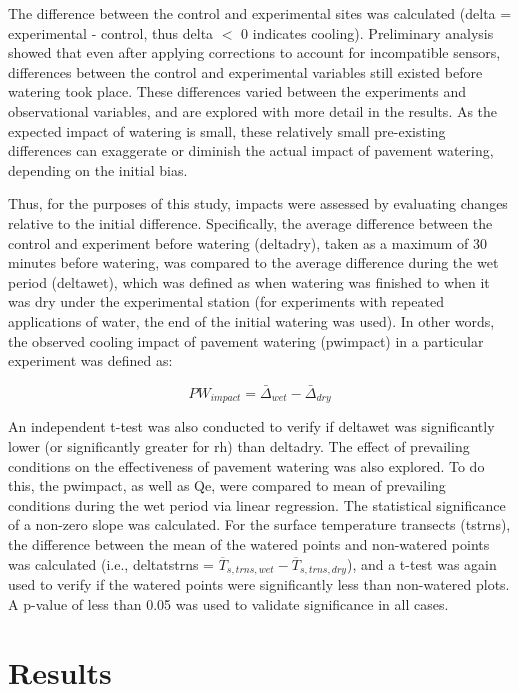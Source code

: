 \documentclass[final,3p,times,authoryear]{elsarticle}
\begin{document}
The difference between the control and experimental sites was calculated (\gls{delta} = experimental - control, thus \gls{delta} $<$ 0 indicates cooling). Preliminary analysis showed that even after applying corrections to account for incompatible sensors, differences between the control and experimental variables still existed before watering took place. These differences varied between the experiments and observational variables, and are explored with more detail in the results. As the expected impact of watering is small, these relatively small pre-existing differences can exaggerate or diminish the actual impact of pavement watering, depending on the initial bias.

Thus, for the purposes of this study, impacts were assessed by evaluating changes relative to the initial difference. Specifically, the average difference between the control and experiment before watering (\gls{deltadry}), taken as a maximum of 30 minutes before watering, was compared to the average difference during the wet period (\gls{deltawet}), which was defined as when watering was finished to when it was dry under the experimental station (for experiments with repeated applications of water, the end of the initial watering was used). In other words, the observed cooling impact of pavement watering (\gls{pwimpact}) in a particular experiment was defined as:

\begin{equation}
PW_{impact} = \bar{\Delta}_{wet} - \bar{\Delta}_{dry}
\label{eq:2.2} 
\end{equation}

An independent t-test was also conducted to verify if \gls{deltawet} was significantly lower (or significantly greater for \gls{rh}) than \gls{deltadry}. The effect of prevailing conditions on the effectiveness of pavement watering was also explored. To do this, the \gls{pwimpact}, as well as \gls{Qe}, were compared to mean of prevailing conditions during the wet period via linear regression. The statistical significance of a non-zero slope was calculated. For the surface temperature transects (\gls{tstrns}), the difference between the mean of the watered points and non-watered points was calculated (i.e., \gls{deltatstrns} = $\overline{T}_{s,trns,wet} - \overline{T}_{s,trns,dry}$), and a t-test was again used to verify if the watered points were significantly less than non-watered plots. A \gls{p}-value of less than 0.05 was used to validate significance in all cases.

\section{Results}\label{sec:discussion3}
\end{document}
